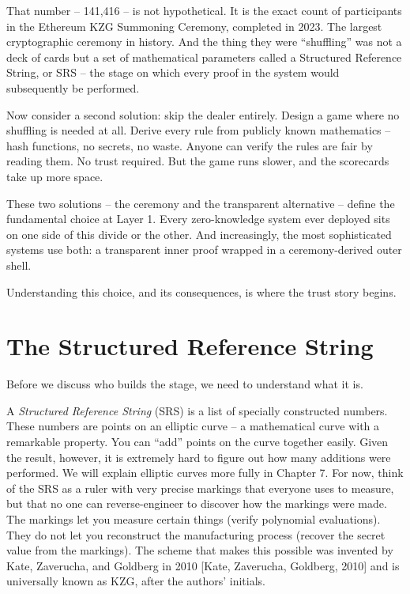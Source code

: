 \documentclass[
  11pt,
  openany]{report}
\begin{document}
That number -- 141,416 -- is not hypothetical. It is the exact count of
participants in the Ethereum KZG Summoning Ceremony, completed in 2023. The
largest cryptographic ceremony in history. And the thing they were ``shuffling''
was not a deck of cards but a set of mathematical parameters called a Structured
Reference String, or SRS -- the stage on which every proof in the system would
subsequently be performed.

Now consider a second solution: skip the dealer entirely. Design a game where no
shuffling is needed at all. Derive every rule from publicly known mathematics --
hash functions, no secrets, no waste. Anyone can verify the rules are fair by
reading them. No trust required. But the game runs slower, and the scorecards
take up more space.

These two solutions -- the ceremony and the transparent alternative -- define
the fundamental choice at Layer 1. Every zero-knowledge system ever deployed
sits on one side of this divide or the other. And increasingly, the most
sophisticated systems use both: a transparent inner proof wrapped in a
ceremony-derived outer shell.

Understanding this choice, and its consequences, is where the trust story
begins.

\section{The Structured Reference String}\label{the-structured-reference-string}

Before we discuss who builds the stage, we need to understand what it is.

A \emph{Structured Reference String} (SRS) is a list of specially constructed
numbers. These numbers are points on an elliptic curve -- a mathematical curve
with a remarkable property. You can ``add'' points on the curve together easily.
Given the result, however, it is extremely hard to figure out how many additions
were performed. We will explain elliptic curves more fully in Chapter 7. For
now, think of the SRS as a ruler with very precise markings that everyone uses
to measure, but that no one can reverse-engineer to discover how the markings
were made. The markings let you measure certain things (verify polynomial
evaluations). They do not let you reconstruct the manufacturing process (recover
the secret value from the markings). The scheme that makes this possible was
invented by Kate, Zaverucha, and Goldberg in 2010 {[}Kate, Zaverucha, Goldberg,
2010{]} and is universally known as KZG, after the authors' initials.
\end{document}
